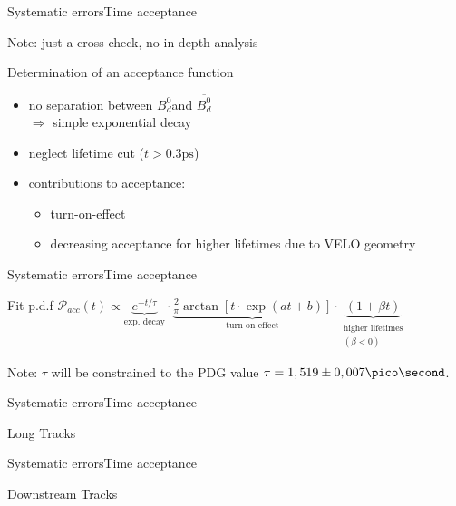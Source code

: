 \documentclass{beamer}
\newcommand{\Bd}{$B_d^0$}
\newcommand{\Bdbar}{$\overline{B_d^0}$}
\begin{document}
    \begin{frame}{Systematic errors}{Time acceptance}
    \begin{alert}{Note:}
    just a cross-check, no in-depth analysis
    \end{alert}
    \begin{block}{Determination of an acceptance function}
    \begin{itemize}
    \item no separation between \Bd and \Bdbar \\
          $\Rightarrow$ simple exponential decay
    \item neglect lifetime cut ($t > 0.3\text{ps}$)
    \item contributions to acceptance:
          \begin{itemize}
          \item turn-on-effect
          \item decreasing acceptance for higher lifetimes due to VELO geometry
          \end{itemize}
    \end{itemize}
    \end{block}
\end{frame}

\begin{frame}{Systematic errors}{Time acceptance}
    \begin{block}{Fit p.d.f}
    $\mathcal{P}_{acc}(t) \propto \underbrace{e^{-t/\tau}}_{\text{exp. decay}} \cdot \underbrace{\frac{2}{\pi}\arctan[t\cdot \exp(at+b)]}_{\text{turn-on-effect}} \cdot \underbrace{(1 + \beta t)}_{\substack{\text{higher lifetimes} \\(\beta<0)}}$
    \end{block}
    \begin{alert}{Note:}
    $\tau$ will be constrained to the PDG value $\tau = 1,519 \pm 0,007 \pico\second$.
    \end{alert}
\end{frame}

\begin{frame}{Systematic errors}{Time acceptance}
\begin{block}{Long Tracks}
\end{block}
\end{frame}

\begin{frame}{Systematic errors}{Time acceptance}
\begin{block}{Downstream Tracks}
\end{block}
\end{frame}
\end{document}
